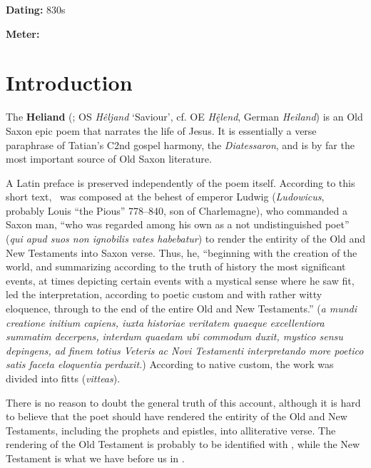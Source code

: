 \def\thisBookCode{Heliand}

\begin{flushright}%
\textbf{Dating:} 830s

\textbf{Meter:} \Fornyrdislag%
\end{flushright}%

\section{Introduction}

The \textbf{Heliand} (\Heliand; OS \emph{Hêljand} ‘Saviour’, cf. OE \emph{Hę̂lend}, German \emph{Heiland}) is an Old Saxon epic poem that narrates the life of Jesus.  It is essentially a verse paraphrase of Tatian’s C2nd gospel harmony, the \emph{Diatessaron}, and is by far the most important source of Old Saxon literature.

A Latin preface is preserved independently of the poem itself.  According to this short text, \Heliand\ was composed at the behest of emperor Ludwig (\emph{Ludowicus}, probably Louis “the Pious” 778–840, son of Charlemagne), who commanded a Saxon man, “who was regarded among his own as a not undistinguished poet” (\emph{qui apud suos non ignobilis vates habebatur}) to render the entirity of the Old and New Testaments into Saxon verse.  Thus, he, “beginning with the creation of the world, and summarizing according to the truth of history the most significant events, at times depicting certain events with a mystical sense where he saw fit, led the interpretation, according to poetic custom and with rather witty eloquence, through to the end of the entire Old and New Testaments.” (\emph{a mundi creatione initium capiens, iuxta historiae veritatem quaeque excellentiora summatim decerpens, interdum quaedam ubi commodum duxit, mystico sensu depingens, ad finem totius Veteris ac Novi Testamenti interpretando more poetico satis faceta eloquentia perduxit.})  According to native custom, the work was divided into fitts (\emph{vitteas}).

There is no reason to doubt the general truth of this account, although it is hard to believe that the poet should have rendered the entirity of the Old and New Testaments, including the prophets and epistles, into alliterative verse.  The rendering of the Old Testament is probably to be identified with \SaxonGenesis, while the New Testament is what we have before us in \Heliand.

